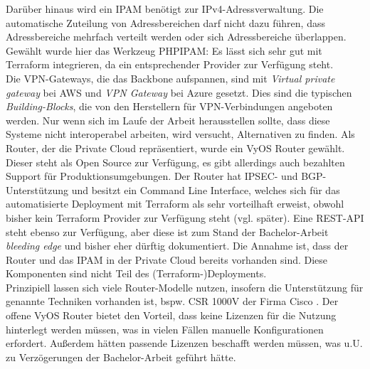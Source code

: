 
Darüber hinaus wird ein IPAM benötigt zur IPv4-Adressverwaltung. Die automatische Zuteilung von Adressbereichen darf nicht dazu führen, dass Adressbereiche mehrfach verteilt werden oder sich Adressbereiche überlappen. Gewählt wurde hier das Werkzeug PHPIPAM: Es lässt sich sehr gut mit Terraform integrieren, da ein entsprechender Provider zur Verfügung steht.\\
Die VPN-Gateways, die das Backbone aufspannen, sind mit \textit{Virtual private gateway} bei AWS und \textit{VPN Gateway} bei Azure gesetzt. Dies sind die typischen \textit{Building-Blocks}, die von den Herstellern für VPN-Verbindungen angeboten werden. Nur wenn sich im Laufe der Arbeit herausstellen sollte, dass diese Systeme nicht interoperabel arbeiten, wird versucht, Alternativen zu finden. Als Router, der die Private Cloud repräsentiert, wurde ein VyOS Router gewählt. Dieser steht als Open Source zur Verfügung, es gibt allerdings auch bezahlten Support für Produktionsumgebungen. Der Router hat IPSEC- und BGP-Unterstützung und besitzt ein Command Line Interface, welches sich für das automatisierte Deployment mit Terraform als sehr vorteilhaft erweist, obwohl bisher kein Terraform Provider zur Verfügung steht (vgl. später). Eine REST-API steht ebenso zur Verfügung, aber diese ist zum Stand der Bachelor-Arbeit \textit{bleeding edge} und bisher eher dürftig dokumentiert. Die Annahme ist, dass der Router und das IPAM in der Private Cloud bereits vorhanden sind. Diese Komponenten sind nicht Teil des (Terraform-)Deployments.\\
Prinzipiell lassen sich viele Router-Modelle nutzen, insofern die Unterstützung für genannte Techniken vorhanden ist, bspw. CSR 1000V der Firma Cisco \cite{Durai2016}. Der offene VyOS Router bietet den Vorteil, dass keine Lizenzen für die Nutzung hinterlegt werden müssen, was in vielen Fällen manuelle Konfigurationen erfordert. Außerdem hätten passende Lizenzen beschafft werden müssen, was u.U. zu Verzögerungen der Bachelor-Arbeit geführt hätte.

